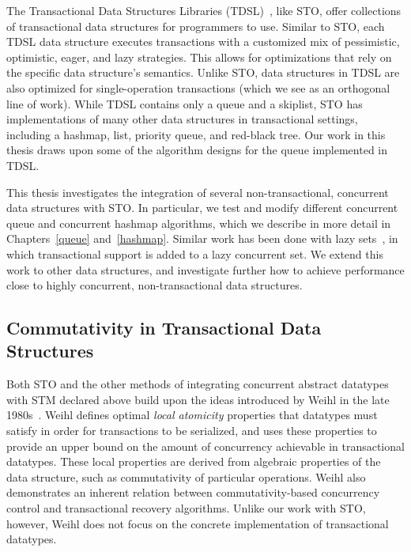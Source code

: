The Transactional Data Structures Libraries (TDSL)~\cite{tdsl}, like STO, offer collections of transactional data structures for programmers to use. Similar to STO, each TDSL data structure executes transactions with a customized mix of pessimistic, optimistic, eager, and lazy strategies.
This allows for optimizations that rely on the specific data structure's semantics. Unlike STO, data structures in TDSL are also optimized for single-operation transactions (which we see as an orthogonal line of work). While TDSL contains only a queue and a skiplist, STO has implementations of many other data structures in transactional settings, including a hashmap, list, priority queue, and red-black tree. Our work in this thesis draws upon some of the algorithm designs for the queue implemented in TDSL.

This thesis investigates the integration of several non-transactional, concurrent data structures with STO. In particular, we test and modify different concurrent queue and concurrent hashmap algorithms, which we describe in more detail in Chapters~\ref{queue} and~\ref{hashmap}. Similar work has been done with lazy sets~\cite{lazyset}, in which transactional support is added to a lazy concurrent set. We extend this work to other data structures, and investigate further how to achieve performance close to highly concurrent, non-transactional data structures.

\subsection{Commutativity in Transactional Data Structures}

Both STO and the other methods of integrating concurrent abstract datatypes with STM declared above build upon the ideas introduced by Weihl in the late 1980s~\cite{weihl}. Weihl defines optimal \emph{local atomicity} properties that datatypes must satisfy in order for transactions to be serialized, and uses these properties to provide an upper bound on the amount of concurrency achievable in transactional datatypes. These local properties are derived from algebraic properties of the data structure, such as commutativity of particular operations. Weihl also demonstrates an inherent relation between commutativity-based concurrency control and transactional recovery algorithms. Unlike our work with STO, however, Weihl does not focus on the concrete implementation of transactional datatypes.

